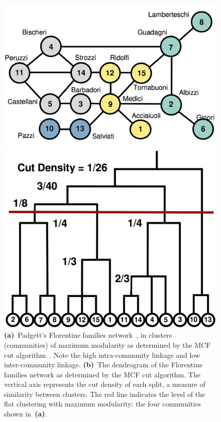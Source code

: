 \begin{figure}
	\centering
	\begin{minipage}{0.525\linewidth}
		\centering\includegraphics[width=\linewidth]{fig/florentine_cluster}
	\end{minipage}
	\begin{minipage}{0.375\linewidth}
		\centering\includegraphics[width=\linewidth]{fig/florentine_dendrogram}
	\end{minipage}
	\caption{\textbf{(a)}~Padgett's Florentine families network~\cite{padgett1993robust}, in clusters (communities) of maximum modularity as determined by the MCF cut algorithm~\cite{mann2008sparsest}. Note the high intra-community linkage and low inter-community linkage. \textbf{(b)}~The dendrogram of the Florentine families network as determined by the MCF cut algorithm. The vertical axis represents the cut density of each split, a measure of similarity between clusters. The red line indicates the level of the flat clustering with maximum modularity: the four communities shown in~\textbf{(a)}.}
	\label{fig:florentine_dendrogram}
\end{figure}


